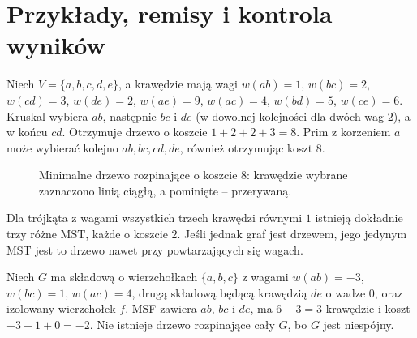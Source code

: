 \section{Przykłady, remisy i kontrola wyników}
\label{sec:tg-mst-examples}

\begin{przyklad}
\label{ex:tg-mst-five}
Niech $V=\{a,b,c,d,e\}$,
a krawędzie mają wagi
$w(ab)=1$, $w(bc)=2$,
$w(cd)=3$, $w(de)=2$,
$w(ae)=9$, $w(ac)=4$,
$w(bd)=5$, $w(ce)=6$.
Kruskal wybiera $ab$,
następnie $bc$ i $de$
(w dowolnej kolejności
dla dwóch wag $2$),
a w końcu $cd$.
Otrzymuje drzewo
o koszcie $1+2+2+3=8$.
Prim z korzeniem $a$
może wybierać kolejno
$ab,bc,cd,de$, również
otrzymując koszt $8$.
\end{przyklad}

\begin{figure}[htbp]
\centering
{}
\caption{Minimalne drzewo rozpinające o koszcie $8$:
krawędzie wybrane zaznaczono linią ciągłą,
a pominięte -- przerywaną.}
\label{fig:tg-mst-five}
\end{figure}

\begin{przyklad}
\label{ex:tg-mst-ties}
Dla trójkąta z wagami wszystkich
trzech krawędzi równymi $1$
istnieją dokładnie trzy różne MST,
każde o koszcie $2$.
Jeśli jednak graf jest drzewem,
jego jedynym MST jest to drzewo
nawet przy powtarzających się wagach.
\end{przyklad}

\begin{przyklad}
\label{ex:tg-mst-disconnected}
Niech $G$ ma składową
o wierzchołkach $\{a,b,c\}$
z wagami $w(ab)=-3$,
$w(bc)=1$, $w(ac)=4$,
drugą składową będącą
krawędzią $de$ o wadze $0$,
oraz izolowany wierzchołek $f$.
MSF zawiera $ab$, $bc$ i $de$,
ma $6-3=3$ krawędzie
i koszt $-3+1+0=-2$.
Nie istnieje drzewo
rozpinające cały $G$,
bo $G$ jest niespójny.
\end{przyklad}

